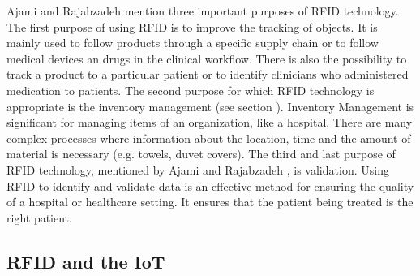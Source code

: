 Ajami and Rajabzadeh \cite{ncbi} mention three important purposes of RFID technology. The first purpose of using RFID is to improve the tracking of objects. It is mainly used to follow products through a specific supply chain or to follow medical devices an drugs in the clinical workflow. There is also the possibility to track a product to a particular patient or to identify clinicians who administered medication to patients.
The second purpose for which RFID technology is appropriate is the inventory management (see section \pageref{inventory}). Inventory Management is significant for managing items of an organization, like a hospital. There are many complex processes where information about the location, time and the amount of material is necessary (e.g. towels, duvet covers).
The third and last purpose of RFID technology, mentioned by Ajami and Rajabzadeh \cite{ncbi}, is validation. Using RFID to identify and validate data is an effective method for ensuring the quality of a hospital or healthcare setting. It ensures that the patient being treated is the right patient.

\subsection{RFID and the IoT}

